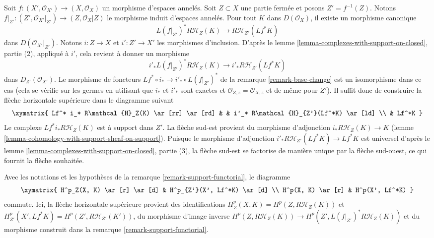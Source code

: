 \begin{remark}

\label{remark-support-functorial}

Soit $f : (X', \mathcal{O}_{X'}) \to (X, \mathcal{O}_X)$ un morphisme d'espaces annelés. Soit $Z \subset X$ une partie fermée et posons $Z' = f^{-1}(Z)$. Notons $f|_{Z'} : (Z', \mathcal{O}_{X'}|_{Z'}) \to (Z, \mathcal{O}_X|Z)$ le morphisme induit d'espaces annelés. Pour tout $K$ dans $D(\mathcal{O}_X)$, il existe un morphisme canonique
$$
L(f|_{Z'})^*R\mathcal{H}_Z(K) \longrightarrow R\mathcal{H}_{Z'}(Lf^*K)
$$
dans $D(\mathcal{O}_{X'}|_{Z'})$. Notons $i : Z \to X$ et $i' : Z' \to X'$
les morphismes d'inclusion. D'après le lemme \ref{lemma-complexes-with-support-on-closed}, partie (2), appliqué à $i'$, cela revient à donner un morphisme
$$
i'_* L(f|_{Z'})^* R\mathcal{H}_Z(K)
\longrightarrow
i'_*R\mathcal{H}_{Z'}(Lf^*K)
$$
dans $D_{Z'}(\mathcal{O}_{X'})$. Le morphisme de foncteurs
$Lf^* \circ i_* \to i'_* \circ L(f|_{Z'})^*$ de la remarque \ref{remark-base-change} est un isomorphisme dans ce cas (cela se vérifie sur les germes en utilisant que $i_*$ et $i'_*$
sont exactes et $\mathcal{O}_{Z, z} = \mathcal{O}_{X, z}$
et de même pour $Z'$). Il suffit donc de construire la flèche horizontale supérieure dans le diagramme suivant
$$
\xymatrix{
Lf^* i_* R\mathcal{H}_Z(K) \ar[rr] \ar[rd] & &
i'_* R\mathcal{H}_{Z'}(Lf^*K) \ar[ld] \\
& Lf^*K
}
$$
Le complexe $Lf^* i_* R\mathcal{H}_Z(K)$ est à support dans $Z'$. La flèche sud-est provient du morphisme d'adjonction $i_*R\mathcal{H}_Z(K) \to K$
(lemme \ref{lemma-cohomology-with-support-sheaf-on-support}). Puisque le morphisme d'adjonction $i'_* R\mathcal{H}_{Z'}(Lf^*K) \to Lf^*K$ est universel d'après le lemme \ref{lemma-complexes-with-support-on-closed}, partie (3), la flèche sud-est se factorise de manière unique par la flèche sud-ouest, ce qui fournit la flèche souhaitée.

\end{remark}

\begin{lemma}

\label{lemma-support-functorial}
Avec les notations et les hypothèses de la remarque \ref{remark-support-functorial}, le diagramme $$
\xymatrix{
H^p_Z(X, K) \ar[r] \ar[d] & H^p_{Z'}(X', Lf^*K) \ar[d] \\
H^p(X, K) \ar[r] & H^p(X', Lf^*K)
}
$$ commute. Ici, la flèche horizontale supérieure provient des identifications $H^p_Z(X, K) = H^p(Z, R\mathcal{H}_Z(K))$ et $H^p_{Z'}(X', Lf^*K) = H^p(Z', R\mathcal{H}_{Z'}(K'))$, du morphisme d'image inverse $H^p(Z, R\mathcal{H}_Z(K)) \to H^p(Z', L(f|_{Z'})^*R\mathcal{H}_Z(K))$ et du morphisme construit dans la remarque \ref{remark-support-functorial}.
\end{lemma}

